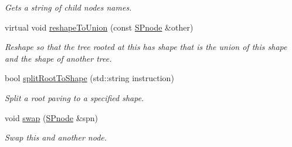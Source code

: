 \begin{DoxyCompactItemize}
\begin{DoxyCompactList}\small\item\em \-Gets a string of child nodes names. \end{DoxyCompactList}\item 
virtual void \hyperlink{classsubpavings_1_1SPnode_a1113235b4bedd4a2849cc8e6dae719dc}{reshape\-To\-Union} (const \hyperlink{classsubpavings_1_1SPnode}{\-S\-Pnode} \&other)
\begin{DoxyCompactList}\small\item\em \-Reshape so that the tree rooted at this has shape that is the union of this shape and the shape of another tree. \end{DoxyCompactList}\item 
bool \hyperlink{classsubpavings_1_1SPnode_a62e9df1a7c96af8f0796a6ea211b38ea}{split\-Root\-To\-Shape} (std\-::string instruction)
\begin{DoxyCompactList}\small\item\em \-Split a root paving to a specified shape. \end{DoxyCompactList}\item 
void \hyperlink{classsubpavings_1_1SPnode_a08eac7d3d3f57b9d6e56a84f14e9f4fb}{swap} (\hyperlink{classsubpavings_1_1SPnode}{\-S\-Pnode} \&spn)
\begin{DoxyCompactList}\small\item\em \-Swap this and another node. \end{DoxyCompactList}\end{DoxyCompactItemize}
